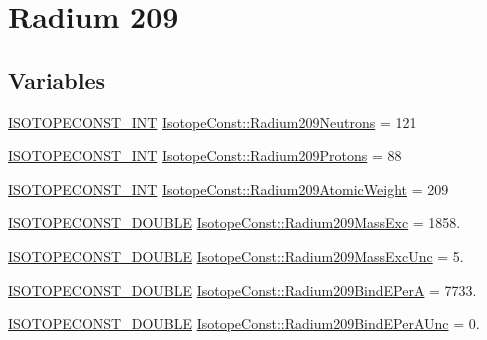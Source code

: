 \hypertarget{group___isotope_const-_radium-_ra209}{}\section{Radium 209}
\label{group___isotope_const-_radium-_ra209}
\subsection*{Variables}
\begin{DoxyCompactItemize}
\item 
\mbox{\hyperlink{group___isotope_const-_macros_ga5f18360b3e99483a35c32d789e62621c}{I\+S\+O\+T\+O\+P\+E\+C\+O\+N\+S\+T\+\_\+\+I\+NT}} \mbox{\hyperlink{group___isotope_const-_radium-_ra209_ga3bfa71f26df645065c2b1e829fc6ce47}{Isotope\+Const\+::\+Radium209\+Neutrons}} = 121
\item 
\mbox{\hyperlink{group___isotope_const-_macros_ga5f18360b3e99483a35c32d789e62621c}{I\+S\+O\+T\+O\+P\+E\+C\+O\+N\+S\+T\+\_\+\+I\+NT}} \mbox{\hyperlink{group___isotope_const-_radium-_ra209_gac5ae9c18e18fef5122a823f21009addb}{Isotope\+Const\+::\+Radium209\+Protons}} = 88
\item 
\mbox{\hyperlink{group___isotope_const-_macros_ga5f18360b3e99483a35c32d789e62621c}{I\+S\+O\+T\+O\+P\+E\+C\+O\+N\+S\+T\+\_\+\+I\+NT}} \mbox{\hyperlink{group___isotope_const-_radium-_ra209_ga404ee466e5334bb6acae900d28dcfea5}{Isotope\+Const\+::\+Radium209\+Atomic\+Weight}} = 209
\item 
\mbox{\hyperlink{group___isotope_const-_macros_ga8f45a7272ce02c0b4c65c44636ed719a}{I\+S\+O\+T\+O\+P\+E\+C\+O\+N\+S\+T\+\_\+\+D\+O\+U\+B\+LE}} \mbox{\hyperlink{group___isotope_const-_radium-_ra209_ga9c6213c59b7b148bc9728a6b321eedc1}{Isotope\+Const\+::\+Radium209\+Mass\+Exc}} = 1858.
\item 
\mbox{\hyperlink{group___isotope_const-_macros_ga8f45a7272ce02c0b4c65c44636ed719a}{I\+S\+O\+T\+O\+P\+E\+C\+O\+N\+S\+T\+\_\+\+D\+O\+U\+B\+LE}} \mbox{\hyperlink{group___isotope_const-_radium-_ra209_ga7617f104a193afb67c4a3562b0ab694a}{Isotope\+Const\+::\+Radium209\+Mass\+Exc\+Unc}} = 5.
\item 
\mbox{\hyperlink{group___isotope_const-_macros_ga8f45a7272ce02c0b4c65c44636ed719a}{I\+S\+O\+T\+O\+P\+E\+C\+O\+N\+S\+T\+\_\+\+D\+O\+U\+B\+LE}} \mbox{\hyperlink{group___isotope_const-_radium-_ra209_ga37534bdc044a00822b358148c4a08364}{Isotope\+Const\+::\+Radium209\+Bind\+E\+PerA}} = 7733.
\item 
\mbox{\hyperlink{group___isotope_const-_macros_ga8f45a7272ce02c0b4c65c44636ed719a}{I\+S\+O\+T\+O\+P\+E\+C\+O\+N\+S\+T\+\_\+\+D\+O\+U\+B\+LE}} \mbox{\hyperlink{group___isotope_const-_radium-_ra209_ga79035b80c0bd79f91c47680e1930d6ab}{Isotope\+Const\+::\+Radium209\+Bind\+E\+Per\+A\+Unc}} = 0.

\end{DoxyCompactItemize}
